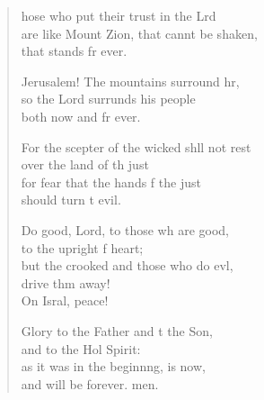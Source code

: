\settowidth{\versewidth}{For the scepter of the wicked shall not rest *}
\begin{verse}%
  \begin{patverse}
hose who put their trust in the Lrd\Flex\\
are like Mount Zion, that cannt be shaken,\Med\\
that stands fr ever.

Jerusalem! The mountains surround hr,\Flex\\
so the Lord surrunds his people\Med\\
both now and fr ever.

For the scepter of the wicked shll not rest\Med\\
over the land of th just\\
for fear that the hands f the just\Med\\
should turn t evil.

Do good, Lord, to those wh are good,\Med\\
to the upright f heart;\\
but the crooked and those who do ev\pointup{\i}l,\Flex\\
drive thm away!\Med\\
On Isral, peace!

Glory to the Father and t the Son,\Med\\
and to the Hol Spirit:\\
as it was in the beginn\pointup{\i}ng, is now,\Med\\
and will be forever. men.
  \end{patverse}
\end{verse}
